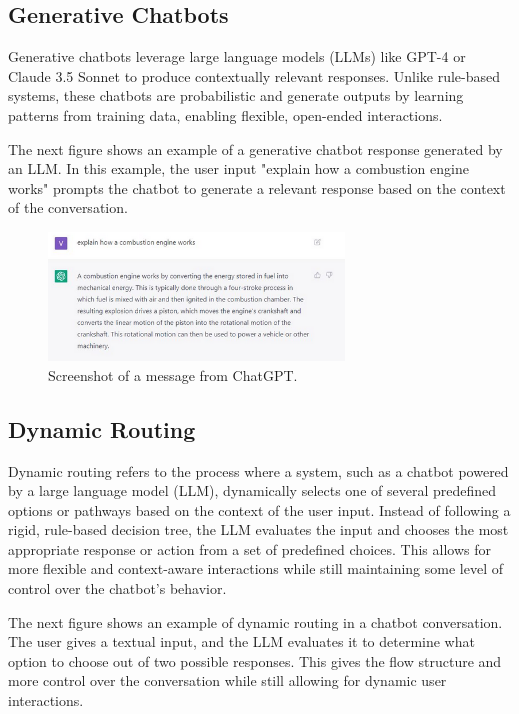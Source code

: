 \subsection{Generative Chatbots}

Generative chatbots leverage large language models (LLMs) like GPT-4 or Claude 3.5 Sonnet to produce contextually relevant responses. Unlike rule-based systems, these chatbots are probabilistic and generate outputs by learning patterns from training data, enabling flexible, open-ended interactions.

The next figure shows an example of a generative chatbot response generated by an LLM. In this example, the user input "explain how a combustion engine works" prompts the chatbot to generate a relevant response based on the context of the conversation.

\begin{figure}[ht]
    \centering
    \includegraphics[width=0.7\textwidth]{assets/ChatgptMessageExample.png}
    \caption{Screenshot of a message from ChatGPT.}
    \label{fig:chatgpt_message}
\end{figure}

\subsection{Dynamic Routing}

Dynamic routing refers to the process where a system, such as a chatbot powered by a large language model (LLM), dynamically selects one of several predefined options or pathways based on the context of the user input. Instead of following a rigid, rule-based decision tree, the LLM evaluates the input and chooses the most appropriate response or action from a set of predefined choices. This allows for more flexible and context-aware interactions while still maintaining some level of control over the chatbot's behavior.

The next figure shows an example of dynamic routing in a chatbot conversation. The user gives a textual input, and the LLM evaluates it to determine what option to choose out of two possible responses. This gives the flow structure and more control over the conversation while still allowing for dynamic user interactions.

